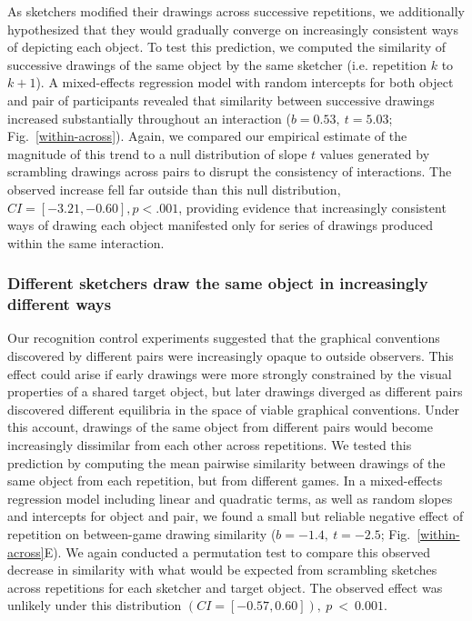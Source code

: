 \documentclass[10pt,letterpaper]{article}
\begin{document}
As sketchers modified their drawings across successive repetitions, we additionally hypothesized that they would gradually converge on increasingly consistent ways of depicting each object.
To test this prediction, we computed the similarity of successive drawings of the same object by the same sketcher (i.e. repetition $k$ to $k+1$). %
A mixed-effects regression model with random intercepts for both object and pair of participants revealed that similarity between successive drawings increased substantially throughout an interaction ($b = 0.53,~t = 5.03$; Fig.~\ref{within-across}).
Again, we compared our empirical estimate of the magnitude of this trend to a null distribution of slope $t$ values generated by scrambling drawings across pairs to disrupt the consistency of interactions.
The observed increase fell far outside than this null distribution, $CI = [-3.21, -0.60], p < .001$, providing evidence that increasingly consistent ways of drawing each object manifested only for series of drawings produced within the same interaction.

\subsubsection{Different sketchers draw the same object in increasingly different ways}

Our recognition control experiments suggested that the graphical conventions discovered by different pairs were increasingly opaque to outside observers.
This effect could arise if early drawings were more strongly constrained by the visual properties of a shared target object, but later drawings diverged as different pairs discovered different equilibria in the space of viable graphical conventions.
Under this account, drawings of the same object from different pairs would become increasingly dissimilar from each other across repetitions.
We tested this prediction by computing the mean pairwise similarity between drawings of the same object from each repetition, but from different games.
In a mixed-effects regression model including linear and quadratic terms, as well as random slopes and intercepts for object and pair, we found a small but reliable negative effect of repetition on between-game drawing similarity ($b = -1.4, ~t = -2.5$; Fig.~\ref{within-across}E). %
We again conducted a permutation test to compare this observed decrease in similarity with what would be expected from scrambling sketches across repetitions for each sketcher and target object. The observed effect was unlikely under this distribution $(CI = [-0.57, 0.60]),~p~<~0.001$.
\end{document}
